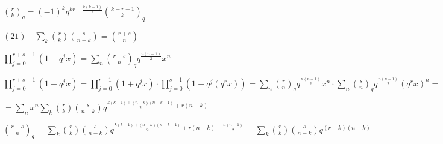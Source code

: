 \documentclass{article}
\begin{document}
\( \binom{r}{k}_q = (-1)^kq^{kr - \frac{k(k-1)}{2}} \binom{k-r-1}{k}_q \)

\( (21)\quad \sum_{k}\binom{r}{k}\binom{s}{n-k} = \binom{r+s}{n} \)

\( \prod_{j=0}^{r+s-1} (1 + q^j x) = \sum_n \binom{r+s}{n}_q q^{\frac{n(n-1)}{2}} x^n \)

\( \prod_{j=0}^{r+s-1} (1 + q^j x) = \prod_{j=0}^{r-1} (1 + q^j x) \cdot \prod_{j=0}^{s-1} (1 + q^j (q^r x)) = \sum_n \binom{r}{n}_q q^{\frac{n(n-1)}{2}} x^n \cdot \sum_n \binom{s}{n}_q q^{\frac{n(n-1)}{2}} (q^rx)^n = \)

\( = \sum_n x^n \sum_k \binom{r}{k}\binom{s}{n-k}q^{\frac{k(k-1) + (n-k)(n-k-1)}{2} + r(n-k)} \)

\( \binom{r+s}{n}_q = \sum_k \binom{r}{k}\binom{s}{n-k}q^{\frac{k(k-1) + (n-k)(n-k-1)}{2} + r(n-k) - \frac{n(n-1)}{2}} = \sum_k \binom{r}{k}\binom{s}{n-k}q^{(r-k)(n-k)} \)
\end{document}
